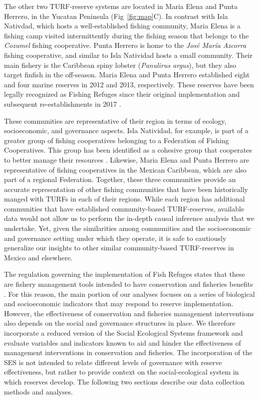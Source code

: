 \documentclass[10pt,letterpaper]{article}
\begin{document}
The other two TURF-reserve systems are located in Maria Elena and Punta Herrero, in the Yucatan Peninsula (Fig~\ref{fig:map}C). In contrast with Isla Nativdad, which hosts a well-established fishing community, Maria Elena is a fishing camp visited intermittently during the fishing season that belongs to the \emph{Cozumel} fishing cooperative. Punta Herrero is home to the \emph{José María Azcorra} fishing cooperative, and similar to Isla Natividad hosts a small community. Their main fishery is the Caribbean spiny lobster (\emph{Panulirus argus}), but they also target finfish in the off-season. Maria Elena and Punta Herrero established eight and four marine reserves in 2012 and 2013, respectively. These reserves have been legally recognized as Fishing Refuges since their original implementation \cite{dof_website_2012,dof_website_2013} and subsequent re-establishments in 2017 \cite{dof_website_2017b}.

These communities are representative of their region in terms of ecology, socioeconomic, and governance aspects. Isla Natividad, for example, is part of a greater group of fishing cooperatives belonging to a Federation of Fishing Cooperatives. This group has been identified as a cohesive group that cooperates to better manage their resources \cite{mccay_2014,mccay_2017,acevesbueno_2017}. Likewise, Maria Elena and Punta Herrero are representative of fishing cooperatives in the Mexican Caribbean, which are also part of a regional Federation. Together, these three communities provide an accurate representation of other fishing communities that have been historically manged with TURFs in each of their regions. While each region has additional communities that have established community-based TURF-reserves, available data would not allow us to perform the in-depth causal inference analysis that we undertake. Yet, given the similarities among communities and the socioeconomic and governance setting under which they operate, it is safe to cautiously generalize our insights to other similar community-based TURF-reserves in Mexico and elsewhere.

The regulation governing the implementation of Fish Refuges states that these are fishery management tools intended to have conservation and fisheries benefits \cite{nom}. For this reason, the main portion of our analyses focuses on a series of biological and socioeconomic indicators that may respond to reserve implementation. However, the effectiveness of conservation and fisheries management interventions also depends on the social and governance structures in place. We therefore incorporate a reduced version of the Social Ecological Systems framework \cite{ostrom_2009} and evaluate variables and indicators known to aid and hinder the effectiveness of management interventions in conservation and fisheries. The incorporation of the SES is not intended to relate different levels of governance with reserve effectiveness, but rather to provide context on the social-ecological system in which reserves develop. The following two sections describe our data collection methods and analyses.
\end{document}
